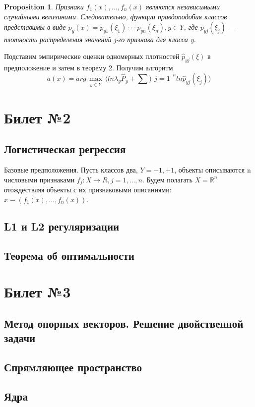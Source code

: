 \documentclass[a4paper]{article}
\theoremstyle{plain}
\newtheorem{proposition}{Proposition}
\theoremstyle{remark}
\theoremstyle{definition}
\newcommand{\setR}{\mathbb{R}}
\begin{document}
\begin{proposition}
Признаки $f_1(x),\ldots, f_n(x)$ являются независимыми случайными величинами. Следовательно, функции правдоподобия классов представимы в виде $p_y(x) = p_{y1}(\xi_1)· · · p_{yn}(\xi_n), y \in Y$, где $p_{yj} (\xi_j )$ — плотность распределения значений j-го признака для класса y.
\end{proposition}
Подставим эмпирические оценки одномерных плотностей $\hat{p}_{yj} (\xi)$ в предположение и затем в теорему 2. Получим алгоритм
$$ a(x) = arg \max_{\substack{y \in Y}} \bigg( ln \lambda_y \hat{P}_y + \sum){\substack{j=1}}^n ln \hat{p}_{yj}(\xi_j) \bigg) $$

\section{Билет №2}
\subsection{Логистическая регрессия}
Базовые предположения. Пусть классов два, $Y = {-1, +1}$, объекты описываются n числовыми признаками $f_j: X \rightarrow R, j = 1, \ldots , n$. Будем полагать $X = \setR^n$ отождествляя объекты с их признаковыми описаниями: $x \equiv (f_1(x), \ldots , f_n(x))$.
\subsection{L1 и L2 регуляризации}

\subsection{Теорема об оптимальности}

\section{Билет №3}
\subsection{Метод опорных векторов. Решение двойственной задачи}
\subsection{Спрямляющее пространство}
\subsection{Ядра}
\end{document}

